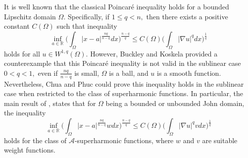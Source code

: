 \documentclass[12pt]{amsart}
\newcommand{\be}{\begin{equation}}
\newcommand{\ee}{\end{equation}}
\numberwithin{equation}{section}
\theoremstyle{plain}
\theoremstyle{definition}
\theoremstyle{remark}
\begin{document}
It is well known that the classical Poincar\'{e} inequality holds for a bounded Lipschitz domain $\Omega$. Specifically, if $1\leq q<n,$ then there exists a positive constant $C(\Omega)$ such that inequality 
\be\label{standardpoincare}
\inf_{a\in\mathbb{R}}\Big( \int_{\Omega}|x-a|^{\frac{nq}{n-q}}dx\Big)^{\frac{n-q}{q}} \leq C(\Omega)\Big(\int_{\Omega}|\nabla u|^{q}dx\Big)^{\frac{1}{q}}
\ee
holds for all $u\in W^{1,q}(\Omega).$ However, Buckley and Koskela \cite{Sp} provided a counterexample that this Poincar\'{e} inequality is not valid in the sublinear case $0<q<1,$ even if $\frac{nq}{n-q}$ is small, $\Omega$ is a ball, and $u$ is a smooth function. Nevertheless, Chua and Phuc \cite{CP} could prove this inequality holds in the sublinear case when restricted to the class of superharmonic functions. In particular, the main result of \cite{CP}, states that for $\Omega$ being a bounded or unbounded John domain, the inequality 
\[
\inf_{a\in\mathbb{R}}\Big( \int_{\Omega}|x-a|^{\frac{nq}{n-q}}wdx\Big)^{\frac{n-q}{q}} \leq C(\Omega)\Big(\int_{\Omega}|\nabla u|^{q}vdx\Big)^{\frac{1}{q}}
\]
holds for  the class of $\mathcal{A}$-superharmonic functions, where $w$ and $v$ are suitable weight functions.
\end{document}
